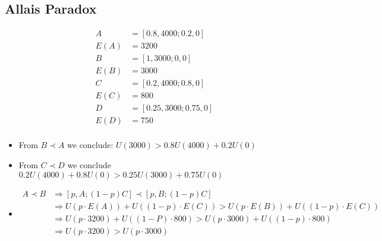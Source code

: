 \documentclass[fleqn,12pt]{scrartcl}
\begin{document}
\subsection{Allais Paradox}
\begin{align*}
	A &= [0.8, 4000; 0.2, 0]\\
	E(A) &= 3200\\
	B &= [1, 3000; 0, 0]\\
	E(B) &= 3000\\
	C &= [0.2, 4000; 0.8, 0]\\
	E(C) &= 800\\
	D &= [0.25, 3000; 0.75, 0]\\
	E(D) &= 750\\
\end{align*}
\begin{itemize}
	\item
From $B \prec A$ we conclude: $U(3000) > 0.8U(4000) + 0.2U(0)$
\item
	From $C \prec D$ we conclude $0.2U(4000) + 0.8U(0)> 0.25U(3000) + 0.75U(0)$
\item
	\begin{align*}
		A \prec B &\Rightarrow [p, A; (1-p) C] \prec [p, B; (1-p) C]\\
		&\Rightarrow U(p\cdot E(A)) + U((1-p)\cdot E(C)) > U(p\cdot E(B)) + U((1-p) \cdot E(C))\\
		&\Rightarrow U(p\cdot3200) + U((1-P) \cdot 800) > U(p\cdot 3000) + U((1-p) \cdot 800)\\
		&\Rightarrow U(p\cdot3200) > U(p\cdot 3000)\\
	\end{align*}
\end{itemize}
\end{document}
